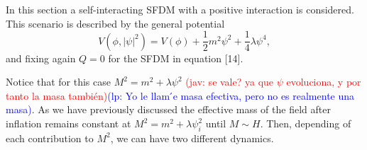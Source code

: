 \documentclass[amssymb,twocolumn,prd,nofootinbib,showpacs]{revtex4-1}
\newcommand{\jav}[1]{\textcolor{red}{(jav: #1)}}
\newcommand{\lp}[1]{\textcolor{blue}{(lp: #1)}}
\begin{document}
In this section a self-interacting SFDM with a positive interaction is considered. This scenario is described by the general potential
\begin{equation}
V(\phi,|\psi|^2)=V(\phi)+\frac{1}{2}m^2\psi^2+\frac{1}{4}\lambda\psi^4,
\end{equation}
and fixing again $Q=0$ for the SFDM in equation [14].

Notice that for this case $M^2=m^2+\lambda\psi^2$ \jav{se vale? ya que $\psi$ 
evoluciona, y por tanto la masa también}\lp{Yo le llam ́e masa efectiva,
pero no es realmente una masa}. 
As we have previously discussed the effective mass of the field after inflation remains 
constant at $M^2=m^2+\lambda\psi_i^2$ until $M\sim H$. Then, depending of each contribution to $M^2$, we can 
have two different dynamics. 
\\
\end{document}
